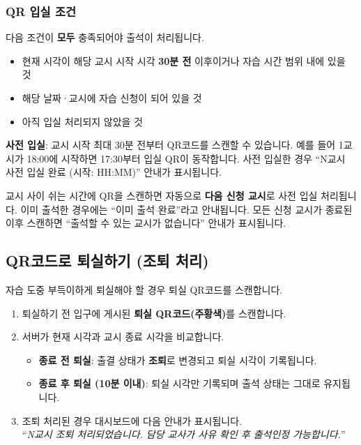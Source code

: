 \documentclass[a4paper,12pt]{article}
\newcommand{\menu}[1]{\textcolor{primary}{\textbf{#1}}}
\begin{document}
\subsubsection{QR 입실 조건}

다음 조건이 \textbf{모두} 충족되어야 출석이 처리됩니다.

\begin{itemize}[leftmargin=1.5em]
    \item 현재 시각이 해당 교시 시작 시각 \textbf{30분 전} 이후이거나 자습 시간 범위 내에 있을 것
    \item 해당 날짜·교시에 자습 신청이 되어 있을 것
    \item 아직 입실 처리되지 않았을 것
\end{itemize}

\begin{notebox}
  \textbf{사전 입실}: 교시 시작 최대 30분 전부터 QR코드를 스캔할 수 있습니다.
  예를 들어 1교시가 18:00에 시작하면 17:30부터 입실 QR이 동작합니다.
  사전 입실한 경우 ``N교시 사전 입실 완료 (시작: HH:MM)'' 안내가 표시됩니다.
\end{notebox}

\begin{tipbox}
  교시 사이 쉬는 시간에 QR을 스캔하면 자동으로 \textbf{다음 신청 교시}로 사전 입실 처리됩니다.
  이미 출석한 경우에는 ``이미 출석 완료''라고 안내됩니다.
  모든 신청 교시가 종료된 이후 스캔하면 ``출석할 수 있는 교시가 없습니다'' 안내가 표시됩니다.
\end{tipbox}

\subsection{QR코드로 퇴실하기 (조퇴 처리)}

자습 도중 부득이하게 퇴실해야 할 경우 퇴실 QR코드를 스캔합니다.

\begin{enumerate}[leftmargin=1.5em]
    \item 퇴실하기 전 입구에 게시된 \textbf{퇴실 QR코드(주황색)}를 스캔합니다.
    \item 서버가 현재 시각과 교시 종료 시각을 비교합니다.
    \begin{itemize}
        \item \textbf{종료 전 퇴실}: 출결 상태가 \menu{조퇴}로 변경되고 퇴실 시각이 기록됩니다.
        \item \textbf{종료 후 퇴실 (10분 이내)}: 퇴실 시각만 기록되며 출석 상태는 그대로 유지됩니다.
    \end{itemize}
    \item 조퇴 처리된 경우 대시보드에 다음 안내가 표시됩니다.\\
          ``\textit{N교시 조퇴 처리되었습니다. 담당 교사가 사유 확인 후 출석인정 가능합니다.}''
\end{enumerate}
\end{document}
